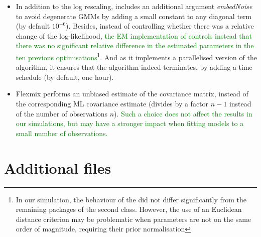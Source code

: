 \begin{itemize}
\item
  In addition to the log rescaling,  includes an additional argument \emph{embedNoise} to avoid degenerate GMMs by adding a small constant to any diagonal term (by default \(10^{-6}\)). Besides, instead of controlling whether there was a relative change of the log-likelihood, \textcolor{green}{the EM implementation of  controls instead that there was no significant relative difference in the estimated parameters in the ten previous optimisations}\footnote{In our simulation, the behaviour of the  did not differ significantly from the remaining packages of the second class.
    However, the use of an Euclidean distance criterion may be problematic when parameters are not on the same order of magnitude, requiring their prior normalisation}. And as it implements a parallelised version of the algorithm, it ensures that the algorithm indeed terminates, by adding a time schedule (by default, one hour).
\item
  Flexmix performs an unbiased estimate of the covariance matrix, instead of the corresponding ML covariance estimate (divides by a factor \(n-1\) instead of the number of observations \(n\)). \textcolor{green}{Such a choice does not affect the results in our simulations, but may have a stronger impact when fitting models to a small number of observations.}
\end{itemize}

\hypertarget{additional-files}{%
\section{Additional files}\label{additional-files}}

